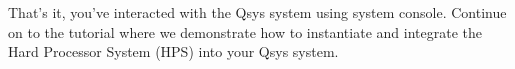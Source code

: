 \begin{flushleft}
\begin{enumerate}[
	label=\textbf{Step \arabic*.},
	leftmargin=*,
	widest={00},
	align=left]
\begin{verbatim}
\end{verbatim}

\end{enumerate}

That's it, you've interacted with the Qsys system using system console.  Continue on to the  tutorial where we demonstrate how to instantiate and integrate the Hard Processor System (HPS) into your Qsys system.

\end{flushleft}



